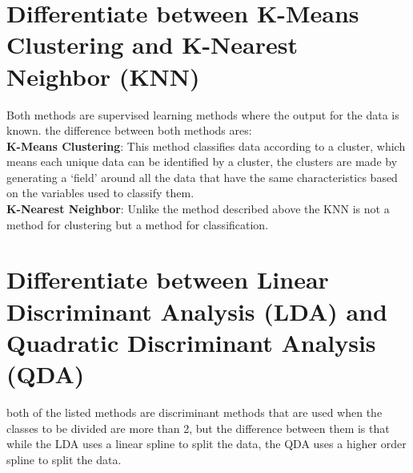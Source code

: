 \documentclass[a4paper,12pt]{report}
\begin{document}
\section{Differentiate between K-Means Clustering and K-Nearest Neighbor (KNN)} 
Both methods are supervised learning methods where the output for the data is known. the difference between both methods ares:
\vspace{0.5cm}\\
\textbf{K-Means Clustering}: This method classifies data according to a cluster, which means each unique data can be identified by a cluster, the clusters are made by generating a `field' around all the data that have the same characteristics based on the variables used to classify them.
\vspace{0.5cm}\\
\textbf{K-Nearest Neighbor}: Unlike the method described above the KNN is not a method for clustering but a method for classification. 
\section{Differentiate between Linear Discriminant Analysis (LDA) and Quadratic Discriminant Analysis (QDA)}
both of the listed methods are  discriminant methods that are used when the classes to be divided are more than 2, but the difference between them is that while the LDA uses a linear spline to split the data, the QDA uses a higher order spline to split the data.
\end{document}
